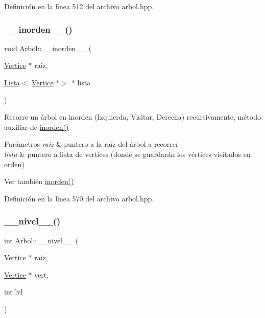Definición en la línea 512 del archivo arbol.\+hpp.

\mbox{\label{classArbol_ae3dc89f7db1fb9b54bcc2489eb1d9542}} 
\subsubsection{\texorpdfstring{\+\_\+\+\_\+inorden\+\_\+\+\_\+()}{\_\_inorden\_\_()}}
{\footnotesize\ttfamily void Arbol\+::\+\_\+\+\_\+inorden\+\_\+\+\_\+ (\begin{DoxyParamCaption}\item[{\hyperlink{classVertice}{Vertice} $\ast$}]{raiz,  }\item[{\hyperlink{classLista}{Lista}$<$ \hyperlink{classVertice}{Vertice} $\ast$$>$ $\ast$}]{lista }\end{DoxyParamCaption})\hspace{0.3cm}{\ttfamily [protected]}}



Recorre un árbol en inorden (Izquierda, Visitar, Derecha) recursivamente, método auxiliar de \hyperlink{classArbol_a80a0c3cf2d7f3e92a5c8e5504947dab5}{inorden()} 


\begin{DoxyParams}{Parámetros}
{\em raiz} & puntero a la raíz del árbol a recorrer \\
\hline
{\em lista} & puntero a lista de vertices (donde se guardarán los vértices visitados en orden) \\
\hline
\end{DoxyParams}
\begin{DoxySeeAlso}{Ver también}
\hyperlink{classArbol_a80a0c3cf2d7f3e92a5c8e5504947dab5}{inorden()} 
\end{DoxySeeAlso}


Definición en la línea 570 del archivo arbol.\+hpp.

\mbox{\label{classArbol_a479d9841f100bf75b87fb2155b66d591}} 
\subsubsection{\texorpdfstring{\+\_\+\+\_\+nivel\+\_\+\+\_\+()}{\_\_nivel\_\_()}}
{\footnotesize\ttfamily int Arbol\+::\+\_\+\+\_\+nivel\+\_\+\+\_\+ (\begin{DoxyParamCaption}\item[{\hyperlink{classVertice}{Vertice} $\ast$}]{raiz,  }\item[{\hyperlink{classVertice}{Vertice} $\ast$}]{vert,  }\item[{int}]{lvl }\end{DoxyParamCaption})\hspace{0.3cm}{\ttfamily [protected]}}



